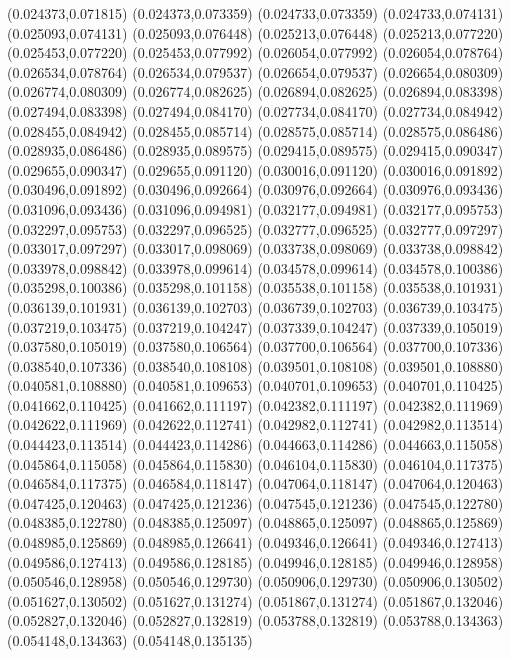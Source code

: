 (0.024373,0.071815)
(0.024373,0.073359)
(0.024733,0.073359)
(0.024733,0.074131)
(0.025093,0.074131)
(0.025093,0.076448)
(0.025213,0.076448)
(0.025213,0.077220)
(0.025453,0.077220)
(0.025453,0.077992)
(0.026054,0.077992)
(0.026054,0.078764)
(0.026534,0.078764)
(0.026534,0.079537)
(0.026654,0.079537)
(0.026654,0.080309)
(0.026774,0.080309)
(0.026774,0.082625)
(0.026894,0.082625)
(0.026894,0.083398)
(0.027494,0.083398)
(0.027494,0.084170)
(0.027734,0.084170)
(0.027734,0.084942)
(0.028455,0.084942)
(0.028455,0.085714)
(0.028575,0.085714)
(0.028575,0.086486)
(0.028935,0.086486)
(0.028935,0.089575)
(0.029415,0.089575)
(0.029415,0.090347)
(0.029655,0.090347)
(0.029655,0.091120)
(0.030016,0.091120)
(0.030016,0.091892)
(0.030496,0.091892)
(0.030496,0.092664)
(0.030976,0.092664)
(0.030976,0.093436)
(0.031096,0.093436)
(0.031096,0.094981)
(0.032177,0.094981)
(0.032177,0.095753)
(0.032297,0.095753)
(0.032297,0.096525)
(0.032777,0.096525)
(0.032777,0.097297)
(0.033017,0.097297)
(0.033017,0.098069)
(0.033738,0.098069)
(0.033738,0.098842)
(0.033978,0.098842)
(0.033978,0.099614)
(0.034578,0.099614)
(0.034578,0.100386)
(0.035298,0.100386)
(0.035298,0.101158)
(0.035538,0.101158)
(0.035538,0.101931)
(0.036139,0.101931)
(0.036139,0.102703)
(0.036739,0.102703)
(0.036739,0.103475)
(0.037219,0.103475)
(0.037219,0.104247)
(0.037339,0.104247)
(0.037339,0.105019)
(0.037580,0.105019)
(0.037580,0.106564)
(0.037700,0.106564)
(0.037700,0.107336)
(0.038540,0.107336)
(0.038540,0.108108)
(0.039501,0.108108)
(0.039501,0.108880)
(0.040581,0.108880)
(0.040581,0.109653)
(0.040701,0.109653)
(0.040701,0.110425)
(0.041662,0.110425)
(0.041662,0.111197)
(0.042382,0.111197)
(0.042382,0.111969)
(0.042622,0.111969)
(0.042622,0.112741)
(0.042982,0.112741)
(0.042982,0.113514)
(0.044423,0.113514)
(0.044423,0.114286)
(0.044663,0.114286)
(0.044663,0.115058)
(0.045864,0.115058)
(0.045864,0.115830)
(0.046104,0.115830)
(0.046104,0.117375)
(0.046584,0.117375)
(0.046584,0.118147)
(0.047064,0.118147)
(0.047064,0.120463)
(0.047425,0.120463)
(0.047425,0.121236)
(0.047545,0.121236)
(0.047545,0.122780)
(0.048385,0.122780)
(0.048385,0.125097)
(0.048865,0.125097)
(0.048865,0.125869)
(0.048985,0.125869)
(0.048985,0.126641)
(0.049346,0.126641)
(0.049346,0.127413)
(0.049586,0.127413)
(0.049586,0.128185)
(0.049946,0.128185)
(0.049946,0.128958)
(0.050546,0.128958)
(0.050546,0.129730)
(0.050906,0.129730)
(0.050906,0.130502)
(0.051627,0.130502)
(0.051627,0.131274)
(0.051867,0.131274)
(0.051867,0.132046)
(0.052827,0.132046)
(0.052827,0.132819)
(0.053788,0.132819)
(0.053788,0.134363)
(0.054148,0.134363)
(0.054148,0.135135)
